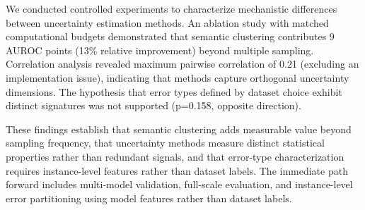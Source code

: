 
We conducted controlled experiments to characterize mechanistic differences between uncertainty estimation methods. An ablation study with matched computational budgets demonstrated that semantic clustering contributes 9 AUROC points (13\% relative improvement) beyond multiple sampling. Correlation analysis revealed maximum pairwise correlation of 0.21 (excluding an implementation issue), indicating that methods capture orthogonal uncertainty dimensions. The hypothesis that error types defined by dataset choice exhibit distinct signatures was not supported (p=0.158, opposite direction).

These findings establish that semantic clustering adds measurable value beyond sampling frequency, that uncertainty methods measure distinct statistical properties rather than redundant signals, and that error-type characterization requires instance-level features rather than dataset labels. The immediate path forward includes multi-model validation, full-scale evaluation, and instance-level error partitioning using model features rather than dataset labels.
